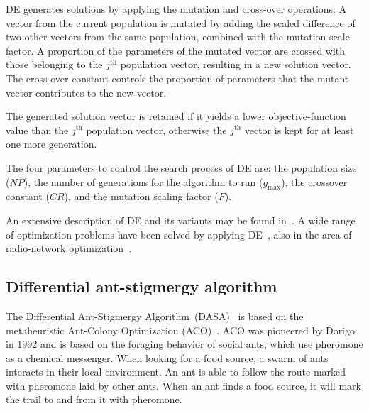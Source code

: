 DE generates solutions by applying the mutation and cross-over operations.
A vector from the current population is mutated by adding the scaled
difference of two other vectors from the same population, combined
with the mutation-scale factor. A proportion of the parameters of
the mutated vector are crossed with those belonging to the $j^{\mathrm{th}}$
population vector, resulting in a new solution vector. The cross-over
constant controls the proportion of parameters that the mutant vector
contributes to the new vector.

The generated solution vector is retained if it yields a lower objective-function
value than the $j^{\mathrm{th}}$ population vector, otherwise the
$j^{\mathrm{th}}$ vector is kept for at least one more generation.

The four parameters to control the search process of DE are: the population
size ($NP$), the number
of generations for the algorithm to run ($g_{\mathrm{max}}$),
the crossover constant ($CR$),
and the mutation scaling factor ($F$).

An extensive description of DE and its variants may be found in~\cite{Price-Differential_evolution_a_practical_approach:2005}.
A wide range of optimization problems have been solved by applying
DE~\cite{das2010_differential_evolution_state_of_the_art}, also
in the area of radio-network optimization~\cite{Benedicic_Balancing_downlink_uplink_soft_handover_areas_in_UMTS_networks:2012,DaSilva-Analysis_of_parameter_settings_for_differential_evolution:2008,Mendes-A_differencial_evolution_algorithm_to_optimize_the_radio_network_design:2006}.


\subsection{Differential ant-stigmergy algorithm \label{sub:02-DASA}}

The Differential Ant-Stigmergy Algorithm~(DASA)~\cite{korosec2010_DASA}
is based on the metaheuristic Ant-Colony Optimization (ACO)~\cite{dorigo2006ant_colony_optimization}.
ACO was pioneered by Dorigo in 1992 and is based on the foraging behavior
of social ants, which use pheromone as a chemical messenger. When
looking for a food source, a swarm of ants interacts in their local
environment. An ant is able to follow the route marked with pheromone
laid by other ants. When an ant finds a food source, it will mark
the trail to and from it with pheromone.


